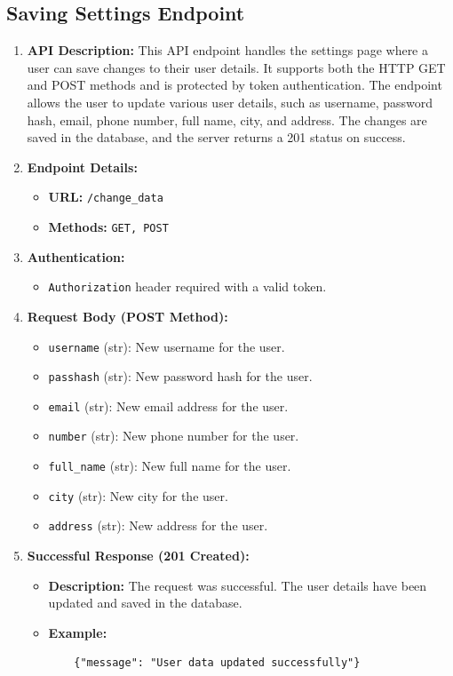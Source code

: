 \documentclass[a4 paper, 12pt]{article}
\begin{document}
\subsection{Saving Settings Endpoint}

\begin{enumerate}
  \item \textbf{API Description:} This API endpoint handles the settings page where a user can save changes to their user details. It supports both the HTTP GET and POST methods and is protected by token authentication. The endpoint allows the user to update various user details, such as username, password hash, email, phone number, full name, city, and address. The changes are saved in the database, and the server returns a 201 status on success.

  \item \textbf{Endpoint Details:}
  \begin{itemize}
    \item \textbf{URL:} \texttt{/change\_data}
    \item \textbf{Methods:} \texttt{GET, POST}
  \end{itemize}

  \item \textbf{Authentication:}
  \begin{itemize}
    \item \texttt{Authorization} header required with a valid token.
  \end{itemize}

  \item \textbf{Request Body (POST Method):}
  \begin{itemize}
    \item \texttt{username} (str): New username for the user.
    \item \texttt{passhash} (str): New password hash for the user.
    \item \texttt{email} (str): New email address for the user.
    \item \texttt{number} (str): New phone number for the user.
    \item \texttt{full\_name} (str): New full name for the user.
    \item \texttt{city} (str): New city for the user.
    \item \texttt{address} (str): New address for the user.
  \end{itemize}

  \item \textbf{Successful Response (201 Created):}
  \begin{itemize}
    \item \textbf{Description:} The request was successful. The user details have been updated and saved in the database.
    \item \textbf{Example:}
    \begin{verbatim}
    {"message": "User data updated successfully"}
    \end{verbatim}
  \end{itemize}


\end{enumerate}
\end{document}
